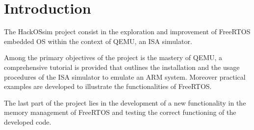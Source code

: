 \section*{Introduction}
The HackOSsim project consist in the exploration and improvement of FreeRTOS embedded OS within the context of QEMU, an ISA simulator.

Among the primary objectives of the project is the mastery of QEMU, a comprehensive tutorial is provided that outlines the installation and the usage procedures of the ISA simulator to emulate an ARM system. Moreover practical examples are developed to illustrate the functionalities of FreeRTOS.

The last part of the project lies in the development of a new functionality in the memory management of FreeRTOS and testing the correct functioning of the developed code.
